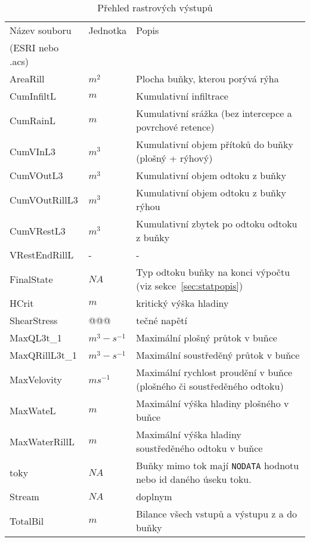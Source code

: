 \begin{table}
 

 \centering
 \caption{Přehled rastrových výstupů}
\label{tab:vystupyrast}

 \begin{tabular}{llp{}}
 \hline
 Název souboru    & Jednotka    & Popis       \\ 
 (ESRI nebo .acs)    &     &        \\ \hline \hline
 AreaRill       &   $m^2$      &  Plocha buňky, kterou porývá rýha \\
 CumInfiltL     &   $m$        & Kumulativní infiltrace \\
 CumRainL       &  $m$  &  Kumulativní srážka (bez intercepce a povrchové retence) \\
 CumVInL3       &  $m^3$  & Kumulativní objem přítoků do buňky  (plošný + rýhový) \\
 CumVOutL3       &  $m^3$  & Kumulativní objem odtoku z buňky \\
 CumVOutRillL3       &  $m^3$  & Kumulativní objem odtoku z buňky rýhou \\
 CumVRestL3      &  $m^3$  & Kumulativní zbytek po odtoku odtoku z buňky\\
 VRestEndRillL   &  - &  - \\
 FinalState    &  $NA$ & Typ odtoku buňky na konci výpočtu (viz sekce~\ref{sec:statpopis})\\
 HCrit            & $m$    &  kritický výška hladiny \\
 ShearStress   &   @@@ &  tečné napětí \\
 MaxQL3t\_1	  &   $m^3-s^{-1}$	&  Maximální plošný průtok v buňce  \\
 MaxQRillL3t\_1    &   $m^3-s^{-1}$	&  Maximální soustředěný průtok v buňce\\
 MaxVelovity	&   $ms^{-1}$	&  Maximální rychlost proudění v buňce (plošného či soustředěného odtoku) \\
 MaxWateL    &   $m$  &   Maximální výška hladiny plošného v buňce \\
 MaxWaterRillL   &   $m$  &   Maximální výška hladiny soustředěného odtoku v buňce \\
 toky   &  $NA$ &  Buňky mimo tok mají {\tt NODATA} hodnotu nebo id daného úseku toku.  \\
 Stream   &  $NA$ & doplnym  \\
 TotalBil   &   $m$  &  Bilance všech vstupů a výstupu z a do buňky  \\
 \end{tabular}

\end{table}



